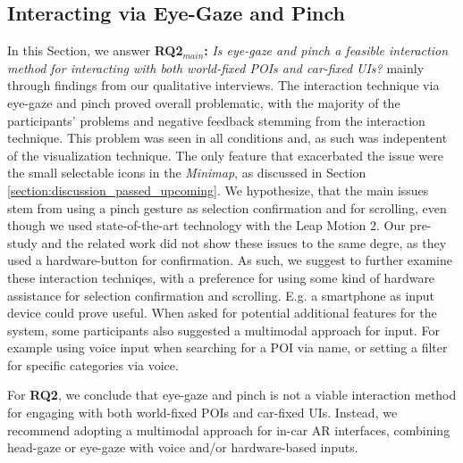 \subsection{Interacting via Eye-Gaze and Pinch}
In this Section, we answer \textbf{RQ2$_{main}$:} \textit{Is eye-gaze and pinch a feasible interaction method for interacting with both world-fixed POIs and car-fixed UIs?} mainly through findings from our qualitative interviews. The interaction technique via eye-gaze and pinch proved overall problematic, with the majority of the participants' problems and negative feedback stemming from the interaction technique. This problem was seen in all conditions and, as such was indepentent of the visualization technique. The only feature that exacerbated the issue were the small selectable icons in the \textit{Minimap}, as discussed in Section \ref{section:discussion_passed_upcoming}. We hypothesize, that the main issues stem from using a pinch gesture as selection confirmation and for scrolling, even though we used state-of-the-art technology with the Leap Motion 2. Our pre-study and the related work \cite{Schramm2023Assessing} did not show these issues to the same degre, as they used a hardware-button for confirmation. As such, we suggest to further examine these interaction techniqes, with a preference for using some kind of hardware assistance for selection confirmation and scrolling. E.g. a smartphone as input device could prove useful. When asked for potential additional features for the system, some participants also suggested a multimodal approach for input. For example using voice input when searching for a POI via name, or setting a filter for specific categories via voice.

For \textbf{RQ2}, we conclude that eye-gaze and pinch is not a viable interaction method for engaging with both world-fixed POIs and car-fixed UIs. Instead, we recommend adopting a multimodal approach for in-car AR interfaces, combining head-gaze or eye-gaze with voice and/or hardware-based inputs.


